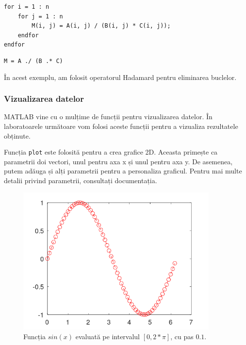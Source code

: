 \documentclass{exam}
\newcommand{\octavescript}[2]{

}
\begin{document}
\begin{lstlisting}
for i = 1 : n
	for j = 1 : n
		M(i, j) = A(i, j) / (B(i, j) * C(i, j));
	endfor
endfor
\end{lstlisting}

\begin{lstlisting}
M = A ./ (B .* C)
\end{lstlisting}

\par În acest exemplu, am folosit operatorul Hadamard pentru eliminarea buclelor.

\subsubsection{Vizualizarea datelor}

\par MATLAB vine cu o mulțime de funcții pentru vizualizarea datelor. În
laboratoarele următoare vom folosi aceste funcții pentru a vizualiza rezultatele
obținute.

\par Funcția \verb|plot| este folosită pentru a crea grafice 2D. Aceasta
primește ca parametrii doi vectori, unul pentru axa x și unul pentru axa y. De
asemenea, putem adăuga și alți parametrii pentru a personaliza graficul. Pentru
mai multe detalii privind parametrii, consultați documentația.

\octavescript{./src/plot1.m}{}

\begin{figure}[ht]
	\centering
	\includegraphics[width=0.9\textwidth]{plot1}
	\caption{Funcția $sin(x)$ evaluată pe intervalul $[0, 2 * \pi]$, cu pas $0.1$.}
\end{figure}
\end{document}
